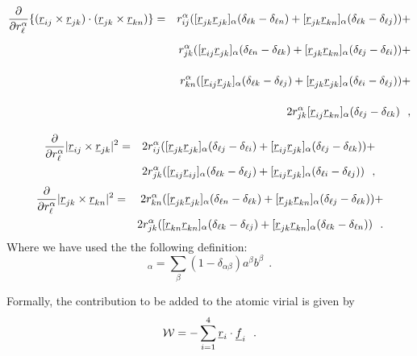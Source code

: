\begin{eqnarray}
\frac{\partial}{\partial r_{\ell}^{\alpha}}
\{(\vek{r}_{ij}\times\vek{r}_{jk})\cdot(\vek{r}_{jk}\times\vek{r}_{kn})\}&=&
r_{ij}^{\alpha}([\vek{r}_{jk}\vek{r}_{jk}]_{\alpha}(\delta_{\ell k}-\delta_{\ell n})+
 [\vek{r}_{jk}\vek{r}_{kn}]_{\alpha}(\delta_{\ell k}-\delta_{\ell j}))+ \nonumber \\
\phantom{\frac{\partial}{\partial r_{\ell}^{\alpha}}}& &
r_{jk}^{\alpha}([\vek{r}_{ij}\vek{r}_{jk}]_{\alpha}
(\delta_{\ell n}-\delta_{\ell k})+ [\vek{r}_{jk}\vek{r}_{kn}]_{\alpha}
(\delta_{\ell j}-\delta_{\ell i}))+ \nonumber \\
\phantom{\frac{\partial}{\partial r_{\ell}^{\alpha}}} & &
r_{kn}^{\alpha}([\vek{r}_{ij}\vek{r}_{jk}]_{\alpha}(\delta_{\ell k}-\delta_{\ell j})+
[\vek{r}_{jk}\vek{r}_{jk}]_{\alpha}(\delta_{\ell i}-\delta_{\ell j}))+ \nonumber \\
\phantom{\frac{\partial}{\partial r_{\ell}^{\alpha}}} & &
2r_{jk}^{\alpha}[\vek{r}_{ij}\vek{r}_{kn}]_{\alpha}(\delta_{\ell j}-\delta_{\ell k})~~,
\end{eqnarray}
\begin{eqnarray}
\frac{\partial}{\partial r_{\ell}^{\alpha}}
|\mbox{$\underline{r}$}_{ij}\times\mbox{$\underline{r}$}_{jk}|^{2}&=&
2r_{ij}^{\alpha}([\mbox{$\underline{r}$}_{jk}\mbox{$\underline{r}$}_{jk}]_{\alpha}(\delta_{\ell j}-\delta_{\ell i})+
[\mbox{$\underline{r}$}_{ij}\mbox{$\underline{r}$}_{jk}]_{\alpha}(\delta_{\ell j}-\delta_{\ell k}))+\nonumber \\
& & 2r_{jk}^{\alpha}([\mbox{$\underline{r}$}_{ij}\mbox{$\underline{r}$}_{ij}]_{\alpha}
(\delta_{\ell k}-\delta_{\ell j}) +[\mbox{$\underline{r}$}_{ij}\mbox{$\underline{r}$}_{jk}]_{\alpha}
(\delta_{\ell i}-\delta_{\ell j}))~~,
\end{eqnarray}
\begin{eqnarray}
\frac{\partial}{\partial r_{\ell}^{\alpha}}
|\mbox{$\underline{r}$}_{jk}\times\mbox{$\underline{r}$}_{kn}|^{2}&=&
2r_{kn}^{\alpha}([\mbox{$\underline{r}$}_{jk}\mbox{$\underline{r}$}_{jk}]_{\alpha}(\delta_{\ell n}-\delta_{\ell k})+
[\mbox{$\underline{r}$}_{jk}\mbox{$\underline{r}$}_{kn}]_{\alpha}(\delta_{\ell j}-\delta_{\ell k}))+\nonumber \\
& & 2r_{jk}^{\alpha}([\mbox{$\underline{r}$}_{kn}\mbox{$\underline{r}$}_{kn}]_{\alpha}
(\delta_{\ell k}-\delta_{\ell j})+
[\mbox{$\underline{r}$}_{jk}\mbox{$\underline{r}$}_{kn}]_{\alpha}(\delta_{\ell k}-\delta_{\ell n}))~~.
\end{eqnarray}
Where we have used the the following definition:
\begin{equation}
[\vek{a}~\vek{b}]_{\alpha} =
\sum_{\beta}(1-\delta_{\alpha\beta})a^{\beta}b^{\beta}~~.
\end{equation}

Formally, the contribution to be added to the atomic virial is given
by
\begin{equation}
{\cal W}=-\sum_{i=1}^{4} \mbox{$\underline{r}$}_{i} \cdot \mbox{$\underline{f}$}_{i}~~.
\end{equation}

